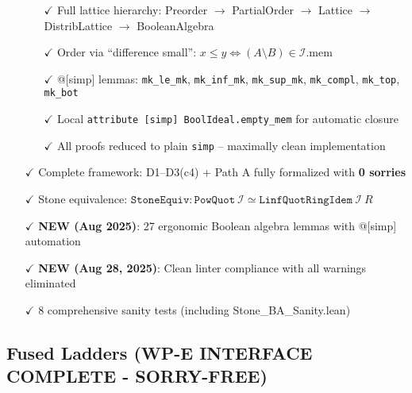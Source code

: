 \documentclass[11pt]{article}
\theoremstyle{definition}
\theoremstyle{remark}
\begin{document}
\begin{itemize}
  \begin{itemize}
  \item[$\checkmark$] Full lattice hierarchy: Preorder $\to$ PartialOrder $\to$ Lattice $\to$ DistribLattice $\to$ BooleanAlgebra
  \item[$\checkmark$] Order via ``difference small'': $x \leq y \Leftrightarrow (A \setminus B) \in \mathcal{I}.\text{mem}$
  \item[$\checkmark$] @[simp] lemmas: \texttt{mk\_le\_mk}, \texttt{mk\_inf\_mk}, \texttt{mk\_sup\_mk}, \texttt{mk\_compl}, \texttt{mk\_top}, \texttt{mk\_bot}
  \item[$\checkmark$] Local \texttt{attribute [simp] BoolIdeal.empty\_mem} for automatic closure
  \item[$\checkmark$] All proofs reduced to plain \texttt{simp} -- maximally clean implementation
  \end{itemize}
\item[$\checkmark$] Complete framework: D1--D3(c4) + Path A fully formalized with \textbf{0 sorries}
\item[$\checkmark$] Stone equivalence: $\texttt{StoneEquiv} : \texttt{PowQuot}\ \mathcal{I} \simeq \texttt{LinfQuotRingIdem}\ \mathcal{I}\ R$
\item[$\checkmark$] \textbf{NEW (Aug 2025)}: 27 ergonomic Boolean algebra lemmas with @[simp] automation
\item[$\checkmark$] \textbf{NEW (Aug 28, 2025)}: Clean linter compliance with all warnings eliminated
\item[$\checkmark$] 8 comprehensive sanity tests (including Stone\_BA\_Sanity.lean)
\end{itemize}

\subsection{Fused Ladders (WP-E INTERFACE COMPLETE - SORRY-FREE)}
\end{document}
